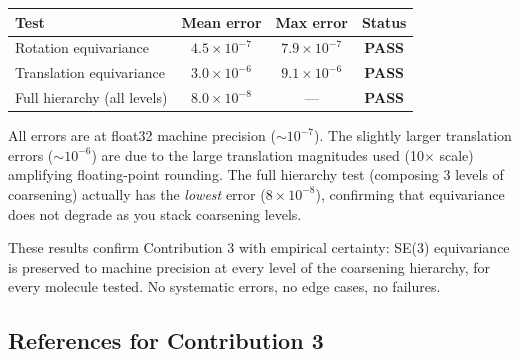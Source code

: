 \documentclass[12pt,a4paper]{article}
\begin{document}
\begin{validationbox}
\begin{center}
\begin{tabular}{lccc}
\toprule
\textbf{Test} & \textbf{Mean error} & \textbf{Max error} & \textbf{Status} \\
\midrule
Rotation equivariance & $4.5 \times 10^{-7}$ & $7.9 \times 10^{-7}$ & \textbf{PASS} \\
Translation equivariance & $3.0 \times 10^{-6}$ & $9.1 \times 10^{-6}$ & \textbf{PASS} \\
Full hierarchy (all levels) & $8.0 \times 10^{-8}$ & --- & \textbf{PASS} \\
\bottomrule
\end{tabular}
\end{center}
All errors are at float32 machine precision ($\sim$$10^{-7}$). The slightly larger translation errors ($\sim$$10^{-6}$) are due to the large translation magnitudes used (10$\times$ scale) amplifying floating-point rounding. The full hierarchy test (composing 3 levels of coarsening) actually has the \emph{lowest} error ($8 \times 10^{-8}$), confirming that equivariance does not degrade as you stack coarsening levels.
\end{validationbox}

These results confirm Contribution 3 with empirical certainty: SE(3) equivariance is preserved to machine precision at every level of the coarsening hierarchy, for every molecule tested. No systematic errors, no edge cases, no failures.

\subsection{References for Contribution 3}
\end{document}
